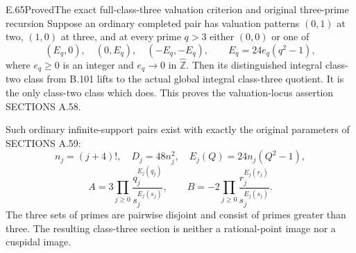 \begin{result}{E.65}{Proved}{The exact full-class-three valuation criterion and original three-prime recursion}
\label{coh:exact-three-recursion}
Suppose an ordinary completed pair has
valuation patterns $(0,1)$ at two,
$(1,0)$ at three, and at every prime
$q>3$ either $(0,0)$ or one of
\[
 (E_q,0),\quad(0,E_q),\quad(-E_q,-E_q),
 \qquad E_q=24e_q(q^2-1),
 \tag{E.65.1}
\]
where $e_q\geq0$ is an integer and
$e_q\to0$ in $\widehat{\mathbb Z}$.
Then its distinguished integral
class-two class from B.101 lifts
to the actual global integral
class-three quotient. It is the
only class-two class which does.
This proves the valuation-locus
assertion SECTIONS A.58.

Such ordinary infinite-support pairs
exist with exactly the original
parameters of SECTIONS A.59:
\[
 n_j=(j+4)!,\quad D_j=48n_j^2,\quad
 E_j(Q)=24n_j(Q^2-1),
 \tag{E.65.2}
\]
\[
 A=3\prod_{j\geq0}
        \frac{q_j^{E_j(q_j)}}{s_j^{E_j(s_j)}},
 \qquad
 B=-2\prod_{j\geq0}
        \frac{r_j^{E_j(r_j)}}{s_j^{E_j(s_j)}}.
 \tag{E.65.3}
\]
The three sets of primes are pairwise
disjoint and consist of primes greater
than three. The resulting class-three
section is neither a rational-point
image nor a cuspidal image.
\end{result}
